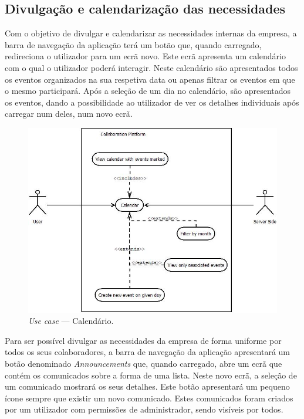 \subsection{Divulgação e calendarização das necessidades}

Com o objetivo de divulgar e calendarizar as necessidades internas da empresa, a barra de navegação da aplicação terá um botão que, quando carregado, 
redireciona o utilizador para um ecrã novo. 
Este ecrã apresenta um calendário com o qual o utilizador poderá interagir.  
Neste calendário são apresentados todos os eventos organizados na sua respetiva data ou apenas filtrar os eventos em que o mesmo participará. 
Após a seleção de um dia no calendário, são apresentados os eventos, dando a possibilidade ao utilizador de ver os detalhes individuais após carregar num deles, 
num novo ecrã.

\begin{figure}[H]
    \centering
    \includegraphics[scale=0.8]{figures/Calendar use case.jpeg}
    \caption{\textit{Use case} --- Calendário.}\label{fig:uc:calendar}
\end{figure}

Para ser possível divulgar as necessidades da empresa de forma uniforme por todos os seus colaboradores, a barra de navegação da aplicação apresentará 
um botão denominado \textit{Announcements} que, quando carregado, abre um ecrã que contém os comunicados sobre a forma de uma lista. 
Neste novo ecrã, a seleção de um comunicado mostrará os seus detalhes. 
Este botão apresentará um pequeno ícone sempre que existir um novo comunicado. 
Estes comunicados foram criados por um utilizador com permissões de administrador, sendo visíveis por todos.

